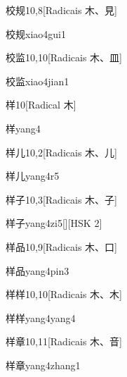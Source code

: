 \begin{entry}{校规}{10,8}[Radicais ⽊、⾒]
  \begin{phonetics}{校规}{xiao4gui1}
  \end{phonetics}
\end{entry}

\begin{entry}{校监}{10,10}[Radicais ⽊、⽫]
  \begin{phonetics}{校监}{xiao4jian1}
  \end{phonetics}
\end{entry}

\begin{entry}{样}{10}[Radical ⽊]
  \begin{phonetics}{样}{yang4}
  \end{phonetics}
\end{entry}

\begin{entry}{样儿}{10,2}[Radicais ⽊、⼉]
  \begin{phonetics}{样儿}{yang4r5}
  \end{phonetics}
\end{entry}

\begin{entry}{样子}{10,3}[Radicais ⽊、⼦]
  \begin{phonetics}{样子}{yang4zi5}[][HSK 2]
  \end{phonetics}
\end{entry}

\begin{entry}{样品}{10,9}[Radicais ⽊、⼝]
  \begin{phonetics}{样品}{yang4pin3}
  \end{phonetics}
\end{entry}

\begin{entry}{样样}{10,10}[Radicais ⽊、⽊]
  \begin{phonetics}{样样}{yang4yang4}
  \end{phonetics}
\end{entry}

\begin{entry}{样章}{10,11}[Radicais ⽊、⾳]
  \begin{phonetics}{样章}{yang4zhang1}
  \end{phonetics}
\end{entry}

